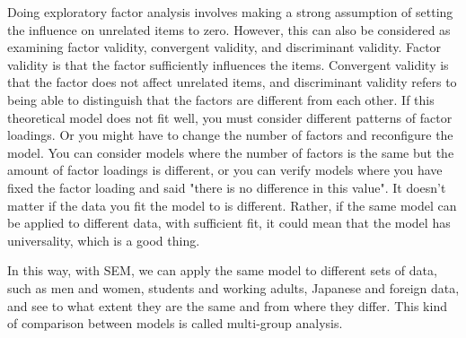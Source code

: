 \documentclass{ltjsbook}
\begin{document}
Doing exploratory factor analysis involves making a strong assumption of setting the influence on unrelated items to zero. However, this can also be considered as examining factor validity, convergent validity, and discriminant validity. Factor validity is that the factor sufficiently influences the items. Convergent validity is that the factor does not affect unrelated items, and discriminant validity refers to being able to distinguish that the factors are different from each other. If this theoretical model does not fit well, you must consider different patterns of factor loadings. Or you might have to change the number of factors and reconfigure the model. You can consider models where the number of factors is the same but the amount of factor loadings is different, or you can verify models where you have fixed the factor loading and said "there is no difference in this value". It doesn't matter if the data you fit the model to is different. Rather, if the same model can be applied to different data, with sufficient fit, it could mean that the model has universality, which is a good thing.

In this way, with SEM, we can apply the same model to different sets of data, such as men and women, students and working adults, Japanese and foreign data, and see to what extent they are the same and from where they differ. This kind of comparison between models is called multi-group analysis.
\end{document}
